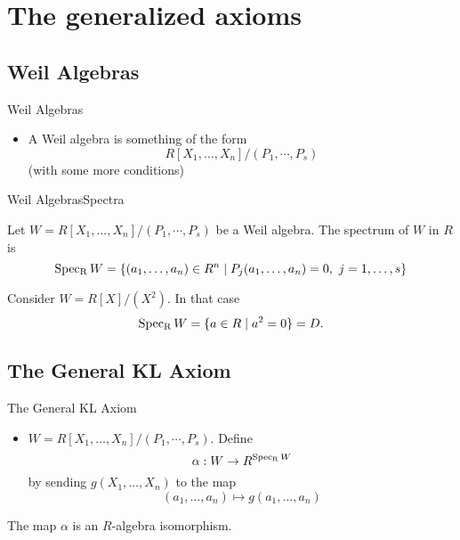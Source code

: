\documentclass{beamer}
\begin{document}
\section{The generalized axioms}

\subsection{Weil Algebras}

\begin{frame}{Weil Algebras}
  \begin{itemize}
    \item A Weil algebra is something of the form
      \begin{equation*}
        R[X_1,\dots,X_n]/(P_1,\cdots,P_s)
      \end{equation*}
      (with some more conditions)
  \end{itemize}
\end{frame}

\begin{frame}{Weil Algebras}{Spectra}
  \begin{defn}
    Let \(W=R[X_1,\dots,X_n]/(P_1,\cdots,P_s)\) be a Weil algebra. The
    \alert{spectrum} of \( W \) in \( R \) is
    \begin{equation*}
      \operatorname{Spec_R} W = \{(a_1,\dots,a_n)\in R^n\mid P_j(a_1,\ldots,a_n)=0,\ j=1,\dots,s\}
    \end{equation*}
  \end{defn}
  \pause
  \begin{exmp}
    Consider \( W=R[X]/(X^2) \). In that case
    \begin{equation*}
      \operatorname{Spec_R} W = \{a\in R\mid a^2=0\} = D.
    \end{equation*}
  \end{exmp}
\end{frame}

\subsection{The General KL Axiom}

\begin{frame}{The General KL Axiom}
  \begin{itemize}
    \item \( W=R[X_1,\dots,X_n]/(P_1,\cdots,P_s) \). Define
      \begin{equation*}
        \alpha: W\to R^{\operatorname{Spec_R} W}
      \end{equation*}
      by sending \( g(X_1,\dots,X_n) \) to the map
      \begin{equation*}
        (a_1,\dots,a_n)\mapsto g(a_1,\dots,a_n) 
      \end{equation*}
  \end{itemize}
  \pause
  \begin{klaxiom}
    The map \( \alpha \) is an \( R \)-algebra isomorphism.
  \end{klaxiom}
\end{frame}
\end{document}

